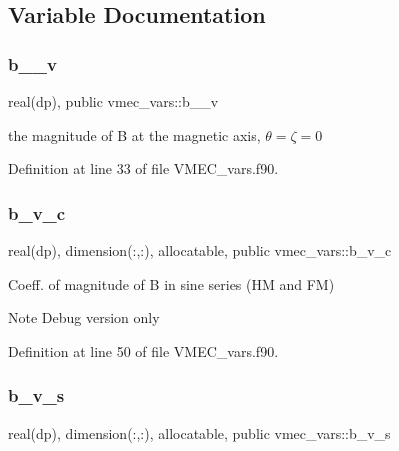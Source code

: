 \subsection{Variable Documentation}
\mbox{\label{namespacevmec__vars_a71e1a738f0e423fe6c284f8ea636008e}} 
\subsubsection{\texorpdfstring{b\+\_\+\_\+v}{b\_0\_v}}
{\footnotesize\ttfamily real(dp), public vmec\+\_\+vars\+::b\+\_\+\_\+v}



the magnitude of B at the magnetic axis, $\theta = \zeta = 0$ 



Definition at line 33 of file V\+M\+E\+C\+\_\+vars.\+f90.

\mbox{\label{namespacevmec__vars_ad6833cc726863147b8fed188d3a28f5d}} 
\subsubsection{\texorpdfstring{b\+\_\+v\+\_\+c}{b\_v\_c}}
{\footnotesize\ttfamily real(dp), dimension(\+:,\+:), allocatable, public vmec\+\_\+vars\+::b\+\_\+v\+\_\+c}



Coeff. of magnitude of B in sine series (HM and FM) 

\begin{DoxyNote}{Note}
Debug version only 
\end{DoxyNote}


Definition at line 50 of file V\+M\+E\+C\+\_\+vars.\+f90.

\mbox{\label{namespacevmec__vars_ab2aa43fe35401e8f2b7ffb2facad7109}} 
\subsubsection{\texorpdfstring{b\+\_\+v\+\_\+s}{b\_v\_s}}
{\footnotesize\ttfamily real(dp), dimension(\+:,\+:), allocatable, public vmec\+\_\+vars\+::b\+\_\+v\+\_\+s}



